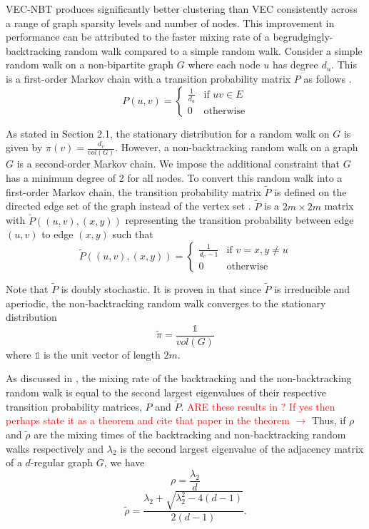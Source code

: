 \documentclass{article} %
\begin{document}
VEC-NBT produces significantly better clustering than VEC consistently across a range of graph sparsity levels and number of nodes. This improvement in performance can be attributed to the faster mixing rate of a begrudgingly-backtracking random walk compared to a simple random walk.
Consider a simple random walk on a non-bipartite graph $G$  where each node $u$ has degree $d_u$. This is a first-order Markov chain with a transition probability matrix $P$ as follows \cite{Lovasz}.
\[
    P(u,v) = 
    \begin{cases} 
        \displaystyle\frac{1}{d_u} & \text{if } uv \in E \\
        0 & \text{otherwise} 
    \end{cases}
\]

As stated in Section 2.1, the stationary distribution for a random walk on $G$ is given by $\displaystyle\pi(v) = \frac{d_v}{vol(G)}$. However, a non-backtracking random walk on a graph $G$ is a second-order Markov chain. We impose the additional constraint that $G$ has a minimum degree of 2 for all nodes. To convert this random walk into a first-order Markov chain, the transition probability matrix $\tilde P$ is defined on the directed edge set of the graph instead of the vertex set \cite{NBT-Ihara}. $\tilde P$ is a $2m \times 2m$ matrix with $\tilde P((u,v), (x,y))$ representing the transition probability between edge $(u,v)$ to edge $(x,y)$ such that
\[\tilde P((u,v), (x,y)) = 
    \begin{cases} 
        \displaystyle\frac{1}{d_v-1} & \text{if } v = x, y \neq u\\
        0 & \text{otherwise}
    \end{cases}
\]

Note that $\tilde P$ is doubly stochastic. It is proven in \cite{NBT-Ihara} that since $\tilde P$ is irreducible and aperiodic, the non-backtracking random walk converges to the stationary distribution
$$\tilde \pi = \frac{\mathds{1}}{vol(G)}$$
where $\mathds{1}$ is the unit vector of length $2m$.

As discussed in \cite{NBT-Ihara}, the mixing rate of the backtracking and the non-backtracking random walk is equal to the second largest eigenvalues of their respective transition probability matrices, $P$ and $\tilde P$.  \textcolor{red}{ARE these results in \cite{NBT-Ihara}? If yes then perhaps state it as a theorem and cite that paper in the theorem $\rightarrow$} Thus, if $\rho$ and $\tilde \rho$ are the mixing times of the backtracking and non-backtracking random walks respectively and $\lambda_2$ is the second largest eigenvalue of the adjacency matrix of a $d$-regular graph $G$, we have 
$$\rho = \frac{\lambda_2}{d}$$
$$\tilde \rho = \frac{\lambda_2 + \sqrt{\lambda_2^2 - 4(d-1)}}{2(d-1)}.$$
\end{document}
